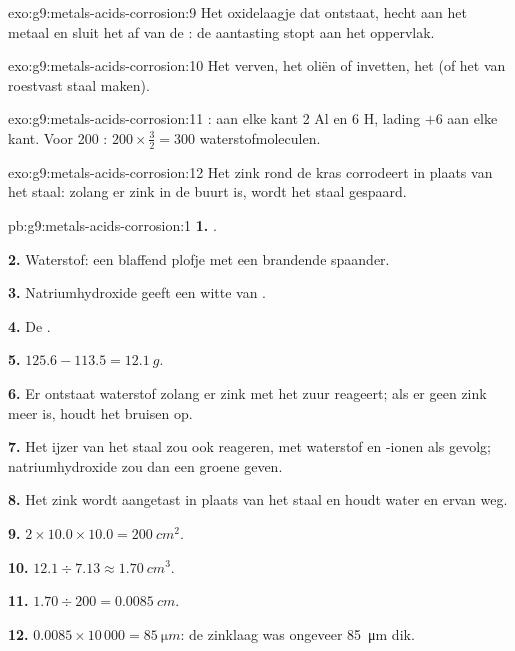 \begin{solution}{exo:g9:metals-acids-corrosion:9}
Het oxidelaagje dat ontstaat, hecht aan het metaal en sluit het af van
de : de aantasting stopt aan het oppervlak.
\end{solution}

\begin{solution}{exo:g9:metals-acids-corrosion:10}
Het verven, het oliën of invetten, het  (of het van roestvast
staal maken).
\end{solution}

\begin{solution}{exo:g9:metals-acids-corrosion:11}
: aan elke kant 2 Al en 6 H,
lading $+6$ aan elke kant. Voor 200 : $200 \times \frac{3}{2} = 300$
waterstofmoleculen.
\end{solution}

\begin{solution}{exo:g9:metals-acids-corrosion:12}
Het zink rond de kras corrodeert in plaats van het staal: zolang er zink
in de buurt is, wordt het staal gespaard.
\end{solution}

\begin{solution}{pb:g9:metals-acids-corrosion:1}
\textbf{1.} .

\textbf{2.} Waterstof: een blaffend plofje met een brandende spaander.

\textbf{3.} Natriumhydroxide geeft een witte  van
.

\textbf{4.} De  .

\textbf{5.} $125.6 - 113.5 = \qty{12.1}{g}$.

\textbf{6.} Er ontstaat waterstof zolang er zink met het zuur reageert;
als er geen zink meer is, houdt het bruisen op.

\textbf{7.} Het ijzer van het staal zou ook reageren, met waterstof en
-ionen als gevolg; natriumhydroxide zou dan een groene
 geven.

\textbf{8.} Het zink wordt aangetast in plaats van het staal en houdt
water en  ervan weg.

\textbf{9.} $2 \times 10.0 \times 10.0 = \qty{200}{cm^2}$.

\textbf{10.} $12.1 \div 7.13 \approx \qty{1.70}{cm^3}$.

\textbf{11.} $1.70 \div 200 = \qty{0.0085}{cm}$.

\textbf{12.} $0.0085 \times 10\,000 = \qty{85}{\micro m}$: de zinklaag
was ongeveer \qty{85}{\micro m} dik.
\end{solution}
